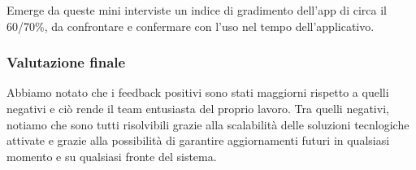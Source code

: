 \begin{flushleft}
            \vspace{0.2cm}
            Emerge da queste mini interviste un indice di gradimento dell'app di circa il 60/70\%, da confrontare e confermare con l'uso nel tempo dell'applicativo.



        \end{flushleft}

    \subsubsection{Valutazione finale}
        \begin{flushleft}
            Abbiamo notato che i feedback positivi sono stati maggiorni rispetto a quelli negativi e ciò rende il team entusiasta del proprio lavoro. Tra quelli negativi, notiamo che sono tutti risolvibili grazie alla scalabilità delle soluzioni tecnlogiche attivate e grazie alla possibilità di garantire aggiornamenti futuri in qualsiasi momento e su qualsiasi fronte del sistema.
        \end{flushleft}